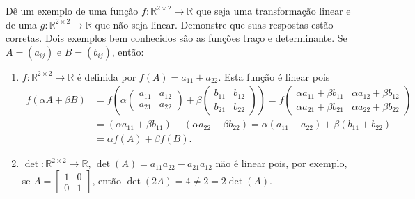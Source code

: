 \documentclass[12pt,a4paper]{article}
\newcommand*\R{\mathbb{R}}
\begin{document}
\begin{ExerciseList}
\Exercise[title={2,0}] Dê um exemplo de uma função $f: \R^{2\times 2} \to \R$ que seja uma transformação linear e de uma $g: \R^{2\times 2} \to \R$ que não seja linear. Demonstre que suas respostas estão corretas.
\Answer Dois exemplos bem conhecidos são as funções traço e determinante. Se $A = (a_{ij})$ e $B = (b_{ij})$, então:
\begin{enumerate}
\item $f: \R^{2 \times 2} \to \R$ é definida por $f(A) = a_{11} + a_{22}$. Esta função é linear pois
\begin{align*}
  f(\alpha A + \beta B)
& = f
\left(
\alpha \begin{pmatrix}
a_{11} & a_{12} \\ a_{21} & a_{22}
\end{pmatrix}
+\beta
\begin{pmatrix}
b_{11} & b_{12} \\ b_{21} & b_{22}
\end{pmatrix}
\right)
=
f
 \begin{pmatrix}
  \alpha a_{11}+\beta b_{11}
& \alpha a_{12}+\beta b_{12}
\\\alpha a_{21}+\beta b_{21}
& \alpha a_{22}+\beta b_{22}
\end{pmatrix} \\
& = 
(\alpha a_{11}+\beta b_{11}) + (\alpha a_{22}+\beta b_{22})
= \alpha (a_{11}+a_{22}) + \beta (b_{11}+b_{22}) \\
& = \alpha f(A) + \beta f(B).
\end{align*}
\item $\operatorname{det}: \R^{2 \times 2} \to \R$, $\operatorname{det}(A) = a_{11}a_{22} - a_{21}a_{12}$ não é linear pois, por exemplo, se $A = \begin{bmatrix}
1 & 0\\0 &1
\end{bmatrix}$, então
$\operatorname{det}(2 A) = 4 \neq 2 = 2\operatorname{det}(A)$.
\end{enumerate}


\end{ExerciseList}
\end{document}
